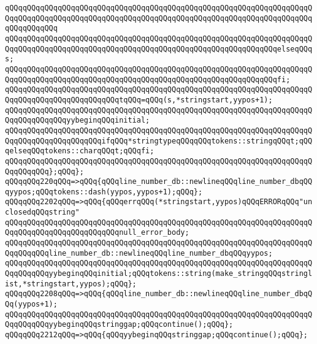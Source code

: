 \verb|qQQqqQQqqQQqqQQqqQQqqQQqqQQqqQQqqQQqqQQqqQQqqQQqqQQqqQQqqQQqqQQqqQQqqQQqqQQqqQQqqQQqqQQqqQQqqQQqqQQqqQQqqQQqqQQqqQQqqQQqqQQqqQQqqQQqqQQqqQQqqQQqqQQqqQQq|\newline
\verb|qQQqqQQqqQQqqQQqqQQqqQQqqQQqqQQqqQQqqQQqqQQqqQQqqQQqqQQqqQQqqQQqqQQqqQQqqQQqqQQqqQQqqQQqqQQqqQQqqQQqqQQqqQQqqQQqqQQqqQQqqQQqqQQqqQQqelseqQQqs;|\newline
\verb|qQQqqQQqqQQqqQQqqQQqqQQqqQQqqQQqqQQqqQQqqQQqqQQqqQQqqQQqqQQqqQQqqQQqqQQqqQQqqQQqqQQqqQQqqQQqqQQqqQQqqQQqqQQqqQQqqQQqqQQqqQQqqQQqqQQqfi;|\newline
\verb|qQQqqQQqqQQqqQQqqQQqqQQqqQQqqQQqqQQqqQQqqQQqqQQqqQQqqQQqqQQqqQQqqQQqqQQqqQQqqQQqqQQqqQQqqQQqqQQqtqQQq=qQQq(s,*stringstart,yypos+1);|\newline
\verb|qQQqqQQqqQQqqQQqqQQqqQQqqQQqqQQqqQQqqQQqqQQqqQQqqQQqqQQqqQQqqQQqqQQqqQQqqQQqqQQqqQQqyybeginqQQqinitial;|\newline
\verb|qQQqqQQqqQQqqQQqqQQqqQQqqQQqqQQqqQQqqQQqqQQqqQQqqQQqqQQqqQQqqQQqqQQqqQQqqQQqqQQqqQQqqQQqqQQqifqQQq*stringtypeqQQqqQQqtokens::stringqQQqt;qQQqelseqQQqtokens::charqQQqt;qQQqfi;|\newline
\verb|qQQqqQQqqQQqqQQqqQQqqQQqqQQqqQQqqQQqqQQqqQQqqQQqqQQqqQQqqQQqqQQqqQQqqQQqqQQqqQQq};qQQq};|\newline
\verb|qQQqqQQq220qQQq=>qQQq{qQQqline_number_db::newlineqQQqline_number_dbqQQqyypos;qQQqtokens::dash(yypos,yypos+1);qQQq};|\newline
\verb|qQQqqQQq2202qQQq=>qQQq{qQQqerrqQQq(*stringstart,yypos)qQQqERRORqQQq"unclosedqQQqstring"|\newline
\verb|qQQqqQQqqQQqqQQqqQQqqQQqqQQqqQQqqQQqqQQqqQQqqQQqqQQqqQQqqQQqqQQqqQQqqQQqqQQqqQQqqQQqqQQqqQQqqQQqnull_error_body;|\newline
\verb|qQQqqQQqqQQqqQQqqQQqqQQqqQQqqQQqqQQqqQQqqQQqqQQqqQQqqQQqqQQqqQQqqQQqqQQqqQQqqQQqline_number_db::newlineqQQqline_number_dbqQQqyypos;|\newline
\verb|qQQqqQQqqQQqqQQqqQQqqQQqqQQqqQQqqQQqqQQqqQQqqQQqqQQqqQQqqQQqqQQqqQQqqQQqqQQqqQQqyybeginqQQqinitial;qQQqtokens::string(make_stringqQQqstringlist,*stringstart,yypos);qQQq};|\newline
\verb|qQQqqQQq2208qQQq=>qQQq{qQQqline_number_db::newlineqQQqline_number_dbqQQq(yypos+1);|\newline
\verb|qQQqqQQqqQQqqQQqqQQqqQQqqQQqqQQqqQQqqQQqqQQqqQQqqQQqqQQqqQQqqQQqqQQqqQQqqQQqqQQqyybeginqQQqstringgap;qQQqcontinue();qQQq};|\newline
\verb|qQQqqQQq2212qQQq=>qQQq{qQQqyybeginqQQqstringgap;qQQqcontinue();qQQq};|\newline

